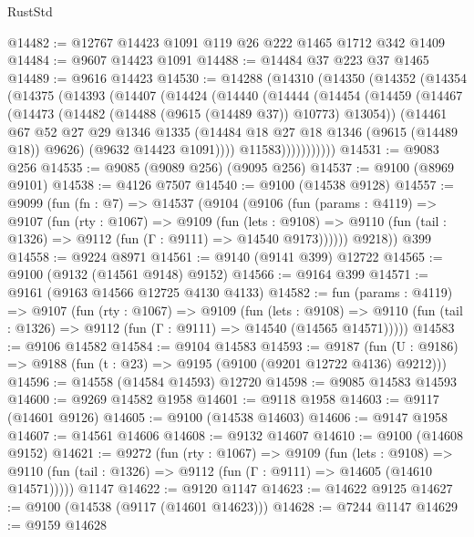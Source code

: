\begin{lexlean}{RustStd}
\begin{coremodule}
@14482 := @12767 @14423 @1091 @119 @26 @222 @1465 @1712 @342 @1409
@14484 := @9607 @14423 @1091
@14488 := @14484 @37 @223 @37 @1465
@14489 := @9616 @14423
@14530 := @14288
    (@14310
      (@14350
        (@14352
          (@14354
            (@14375
              (@14393
                (@14407
                  (@14424
                    (@14440
                      (@14444
                        (@14454
                          (@14459
                            (@14467
                              (@14473 (@14482 (@14488 (@9615 (@14489 @37)) @10773) @13054))
                              (@14461
                                @67
                                @52
                                @27
                                @29
                                @1346
                                @1335
                                (@14484 @18 @27 @18 @1346 (@9615 (@14489 @18)) @9626)
                                (@9632 @14423 @1091))))
                          @11583)))))))))))
@14531 := @9083 @256
@14535 := @9085 (@9089 @256) (@9095 @256)
@14537 := @9100 (@8969 @9101)
@14538 := @4126 @7507
@14540 := @9100 (@14538 @9128)
@14557 := @9099
    (fun (fn : @7) =>
    @14537
      (@9104
        (@9106
          (fun (params : @4119) =>
          @9107
            (fun (rty : @1067) =>
            @9109
              (fun (lets : @9108) =>
              @9110 (fun (tail : @1326) => @9112 (fun (Γ : @9111) => @14540 @9173))))))
        @9218))
    @399
@14558 := @9224 @8971
@14561 := @9140 (@9141 @399) @12722
@14565 := @9100 (@9132 (@14561 @9148) @9152)
@14566 := @9164 @399
@14571 := @9161 (@9163 @14566 @12725 @4130 @4133)
@14582 := fun (params : @4119) =>
  @9107
    (fun (rty : @1067) =>
    @9109
      (fun (lets : @9108) =>
      @9110 (fun (tail : @1326) => @9112 (fun (Γ : @9111) => @14540 (@14565 @14571)))))
@14583 := @9106 @14582
@14584 := @9104 @14583
@14593 := @9187
    (fun (U : @9186) => @9188 (fun (t : @23) => @9195 (@9100 (@9201 @12722 @4136) @9212)))
@14596 := @14558 (@14584 @14593) @12720
@14598 := @9085 @14583 @14593
@14600 := @9269 @14582 @1958
@14601 := @9118 @1958
@14603 := @9117 (@14601 @9126)
@14605 := @9100 (@14538 @14603)
@14606 := @9147 @1958
@14607 := @14561 @14606
@14608 := @9132 @14607
@14610 := @9100 (@14608 @9152)
@14621 := @9272
    (fun (rty : @1067) =>
    @9109
      (fun (lets : @9108) =>
      @9110 (fun (tail : @1326) => @9112 (fun (Γ : @9111) => @14605 (@14610 @14571)))))
    @1147
@14622 := @9120 @1147
@14623 := @14622 @9125
@14627 := @9100 (@14538 (@9117 (@14601 @14623)))
@14628 := @7244 @1147
@14629 := @9159 @14628

\end{coremodule}
\end{lexlean}
